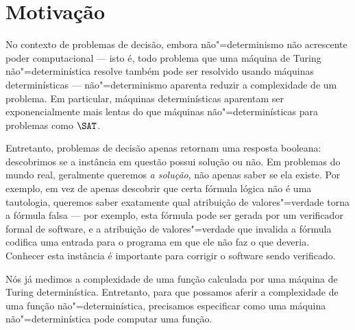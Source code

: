 \section{Motivação}

No contexto de problemas de decisão,
embora não"=determinismo não acrescente poder computacional
--- isto é,
todo problema que uma máquina de Turing não"=determinística resolve
também pode ser resolvido usando máquinas determinísticas
---
não"=determinismo aparenta reduzir a complexidade de um problema.
Em particular,
máquinas determinísticas aparentam ser exponencialmente mais lentas
do que máquinas não"=determinísticas
para problemas como $\SAT$.

Entretanto,
problemas de decisão apenas retornam uma resposta booleana:
descobrimos se a instância em questão possui solução ou não.
Em problemas do mundo real,
geralmente queremos \emph{a solução},
não apenas saber se ela existe.
Por exemplo,
em vez de apenas descobrir que certa fórmula lógica não é uma tautologia,
queremos saber exatamente qual atribuição de valores"=verdade
torna a fórmula falsa
--- por exemplo,
esta fórmula pode ser gerada por um verificador formal de software,
e a atribuição de valores"=verdade que invalida a fórmula
codifica uma entrada para o programa
em que ele não faz o que deveria.
Conhecer esta instância é importante para corrigir o software sendo verificado.

Nós já medimos a complexidade de uma função
calculada por uma máquina de Turing determinística.
Entretanto,
para que possamos aferir a complexidade de uma função não"=determinística,
precisamos especificar como uma máquina não"=determinística pode computar uma função.
